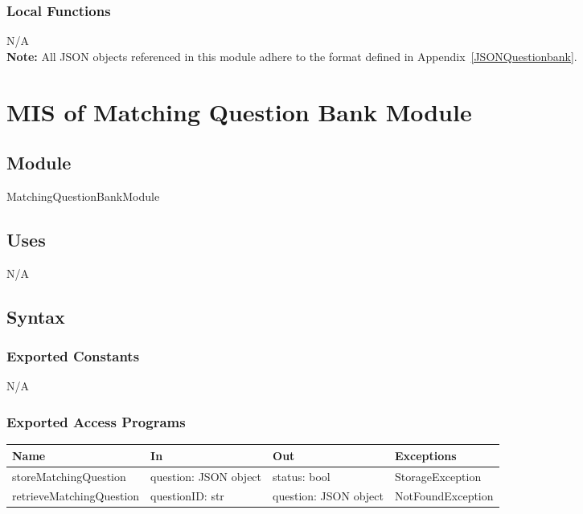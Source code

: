 \documentclass[12pt, titlepage]{article}
\begin{document}
\subsubsection{Local Functions}

N/A\\
\noindent \textbf{Note:} All JSON objects referenced in this module adhere to the format defined in Appendix~\ref{JSONQuestionbank}.
\section{MIS of Matching Question Bank Module} \label{MatchingQuestionBankModule}

\subsection{Module}

MatchingQuestionBankModule

\subsection{Uses}

N/A

\subsection{Syntax}

\subsubsection{Exported Constants}

N/A

\subsubsection{Exported Access Programs}

\begin{center}
\begin{tabular}{p{5cm} p{3cm} p{3cm} p{5cm}}
\hline
\textbf{Name} & \textbf{In} & \textbf{Out} & \textbf{Exceptions} \\
\hline
storeMatchingQuestion & \raggedright\arraybackslash question: JSON object & \raggedright\arraybackslash status: bool & \raggedright\arraybackslash StorageException \\
\hline
retrieveMatchingQuestion & \raggedright\arraybackslash questionID: str & \raggedright\arraybackslash question: JSON object & \raggedright\arraybackslash NotFoundException \\
\hline
\end{tabular}
\end{center}
\end{document}
